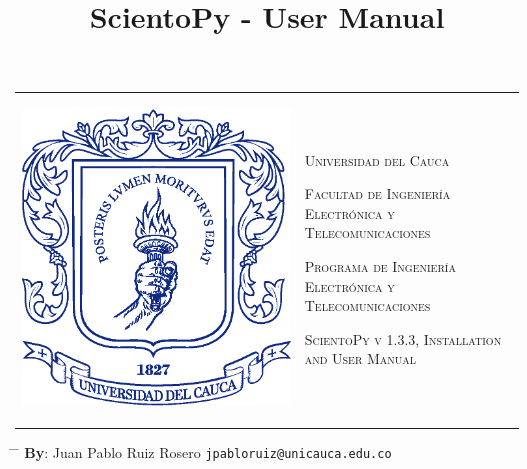 \documentclass[10pt,letterpaper]{article}
\title{ScientoPy - User Manual}
\begin{document}
\newcommand\upquote[1]{\textquotesingle#1\textquotesingle}



\begin{tabular}{p{1.3in}p{6in}}
\begin{flushleft}
\noindent \includegraphics[bb = 2.5cm 0cm 10.29cm 9.78cm,scale=0.2]{./figures/escudoUnicacuaSolo.eps}
\end{flushleft} &
\normalsize \vspace{0.6cm}
\textsc{Universidad del Cauca}

\textsc{Facultad de Ingeniería Electrónica y Telecomunicaciones}

\textsc{Programa de Ingeniería Electrónica y Telecomunicaciones}


\textsc{ScientoPy v 1.3.3, Installation and User Manual}

\end{tabular}
\begin{tabbing}
\hspace{3cm} \= \hspace{5.3cm} \= \hspace{6cm} \kill
\textbf{By}: \> Juan Pablo Ruiz Rosero			\> \texttt{jpabloruiz@unicauca.edu.co} \\
\end{tabbing}
\end{document}
